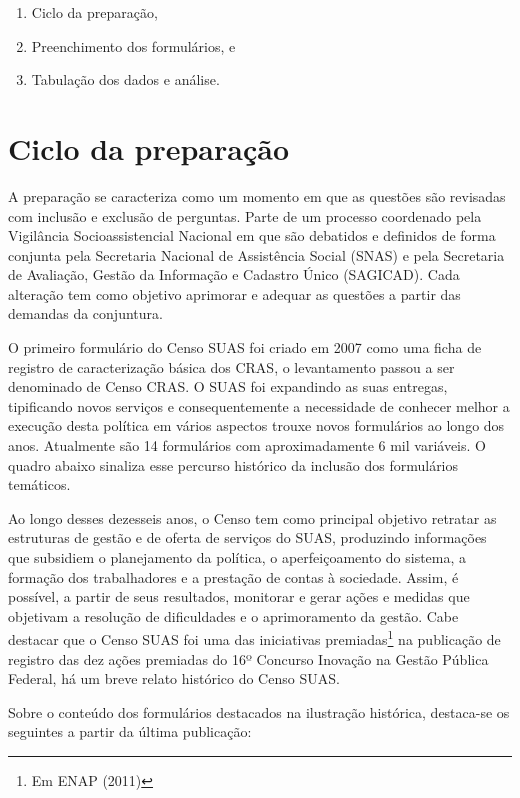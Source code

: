\documentclass[
  brazilian]{report}
\providecommand{\tightlist}{%
  \setlength{\itemsep}{0pt}\setlength{\parskip}{0pt}}
\begin{document}
\begin{enumerate}
\def\labelenumi{\alph{enumi})}
\tightlist
\item
  Ciclo da preparação,
\item
  Preenchimento dos formulários, e
\item
  Tabulação dos dados e análise.
\end{enumerate}

\hypertarget{ciclo-da-preparauxe7uxe3o}{%
\section{Ciclo da preparação}\label{ciclo-da-preparauxe7uxe3o}}

A preparação se caracteriza como um momento em que as questões são
revisadas com inclusão e exclusão de perguntas. Parte de um processo
coordenado pela Vigilância Socioassistencial Nacional em que são
debatidos e definidos de forma conjunta pela Secretaria Nacional de
Assistência Social (SNAS) e pela Secretaria de Avaliação, Gestão da
Informação e Cadastro Único (SAGICAD). Cada alteração tem como objetivo
aprimorar e adequar as questões a partir das demandas da conjuntura.

O primeiro formulário do Censo SUAS foi criado em 2007 como uma ficha de
registro de caracterização básica dos CRAS, o levantamento passou a ser
denominado de Censo CRAS. O SUAS foi expandindo as suas entregas,
tipificando novos serviços e consequentemente a necessidade de conhecer
melhor a execução desta política em vários aspectos trouxe novos
formulários ao longo dos anos. Atualmente são 14 formulários com
aproximadamente 6 mil variáveis. O quadro abaixo sinaliza esse percurso
histórico da inclusão dos formulários temáticos.

Ao longo desses dezesseis anos, o Censo tem como principal objetivo
retratar as estruturas de gestão e de oferta de serviços do SUAS,
produzindo informações que subsidiem o planejamento da política, o
aperfeiçoamento do sistema, a formação dos trabalhadores e a prestação
de contas à sociedade. Assim, é possível, a partir de seus resultados,
monitorar e gerar ações e medidas que objetivam a resolução de
dificuldades e o aprimoramento da gestão. Cabe destacar que o Censo SUAS
foi uma das iniciativas premiadas\footnote{Em ENAP (2011)} na publicação
de registro das dez ações premiadas do 16º Concurso Inovação na Gestão
Pública Federal, há um breve relato histórico do Censo SUAS.

Sobre o conteúdo dos formulários destacados na ilustração histórica,
destaca-se os seguintes a partir da última publicação:
\end{document}

